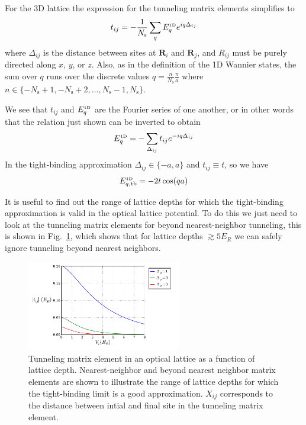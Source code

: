\documentclass[11pt,letter]{article}
\newcommand{\bv}[1]{\ensuremath{\bm{#1}}}
\begin{document}
For the 3D lattice the expression for the tunneling matrix elements simplifies to 
\begin{equation}
  t_{ij} = -\frac{1}{N_{\mathrm{s}}} \sum_{q} E_{q}^{\text{\tiny 1D}} e^{iq \Delta_{ij}} 
\end{equation}
where $\Delta_{ij}$ is the distance between sites at $\bv{R}_{i}$ and $\bv{R}_{j}$, and $R_{ij}$ must be purely directed along $x$, $y$, or $z$.  Also, as in the definition of the 1D Wannier states, the sum over $q$ runs over the discrete
values $q = \frac{n}{N_{\mathrm{s}}} \frac{\pi}{a}$ where 
$ n \in \lbrace
-N_{\mathrm{s}}+1, -N_{\mathrm{s}}+2, \ldots, N_{\mathrm{s}}-1,  N_{\mathrm{s}}  \rbrace$.

We see that $t_{ij}$ and $E_{q}^{\text{\tiny 1D}}$ are the Fourier series of one another, or in other words that the relation just shown can be inverted to obtain
\begin{equation} 
  E_{q}^{\text{\tiny 1D}} = - \sum_{\Delta_{ij}} t_{ij} e^{-iq \Delta_{ij}} 
\end{equation}
In the tight-binding approximation $\Delta_{ij} \in \lbrace -a, a \rbrace$ and $t_{ij}\equiv t$, so we have
\begin{equation}
  E_{q,\text{tb}}^{\text{\tiny 1D}} = -2 t\cos( qa) 
\end{equation}

It is useful to find out the range of lattice depths for which the
tight-binding approximation is valid in the optical lattice potential.  To do
this we just need to look at the tunneling matrix elements for beyond
nearest-neighbor tunneling,  this is shown in Fig.~\ref{fig:tightbinding},
which shows that for lattice depths $\gtrsim 5 E_{R}$  we can safely ignore
tunneling beyond nearest neighbors.  
\begin{figure}
\centering \includegraphics[width=0.6\textwidth]{../BandStructure_figures/tightbinding_V0_interp.pdf}
\caption[Tunneling matrix elements in a 3D lattice.]{\small Tunneling matrix
element in an optical lattice as a function of lattice depth.  Nearest-neighbor
and beyond nearest neighbor matrix elements are shown to illustrate the range
of lattice depths for which the tight-binding limit is a good approximation.
$X_{ij}$ corresponds to the distance between intial and final site in the tunneling matrix element. 
 } \label{fig:tightbinding}
\end{figure}
\end{document}
